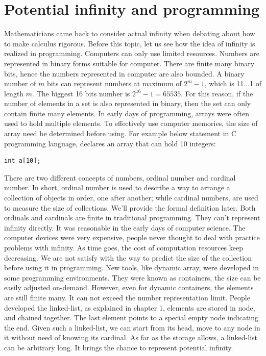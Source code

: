 \documentclass{article}
\begin{document}
\section{Potential infinity and programming}
Mathematicians came back to consider actual infinity when debating about how to make calculus rigorous. Before this topic, let us see how the idea of infinity is realized in programming. Computers can only use limited resources. Numbers are represented in binary forms suitable for computer. There are finite many binary bits, hence the numbers represented in computer are also bounded. A binary number of $m$ bits can represent numbers at maximum of $2^m - 1$, which is 11...1 of length $m$. The biggest 16 bits number is $2^{16} - 1 = 65535$. For this reason, if the number of elements in a set is also represented in binary, then the set can only contain finite many elements. In early days of programming, arrays were often used to hold multiple elements. To effectively use computer memories, the size of array need be determined before using. For example below statement in C programming language, declares an array that can hold 10 integers:

\begin{verbatim}
int a[10];
\end{verbatim}

There are two different concepts of numbers, ordinal number and cardinal number. In short, ordinal number is used to describe a way to arrange a collection of objects in order, one after another; while cardinal numbers, are used to measure the size of collections. We'll provide the formal definition later. Both ordinals and cardinals are finite in traditional programming. They can't represent infinity directly. It was reasonable in the early days of computer science. The computer devices were very expensive, people never thought to deal with practice problems with infinity. As time goes, the cost of computation resources keep decreasing. We are not satisfy with the way to predict the size of the collection before using it in programming. New tools, like dynamic array, were developed in some programming environments. They were known as containers, the size can be easily adjusted on-demand. However, even for dynamic containers, the elements are still finite many. It can not exceed the number representation limit. People developed the linked-list, as explained in chapter 1, elements are stored in node, and chained together. The last element points to a special empty node indicating the end. Given such a linked-list, we can start from its head, move to any node in it without need of knowing its cardinal. As far as the storage allows, a linked-list can be arbitrary long. It brings the chance to represent potential infinity.
\end{document}
